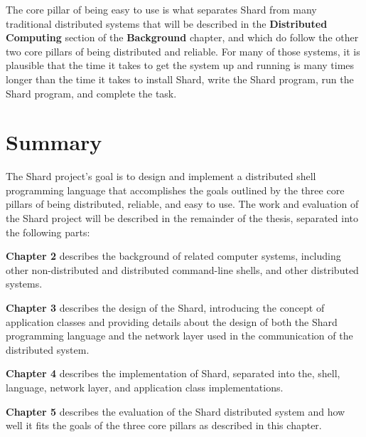 \documentclass[twoside]{report}
\begin{document}
The core pillar of being easy to use is what separates Shard from many traditional distributed systems that will be described in the \textbf{Distributed Computing} section of the \textbf{Background} chapter, and which do follow the other two core pillars of being distributed and reliable. For many of those systems, it is plausible that the time it takes to get the system up and running is many times longer than the time it takes to install Shard, write the Shard program, run the Shard program, and complete the task.

\section{Summary}

The Shard project's goal is to design and implement a distributed shell programming language that accomplishes the goals outlined by the three core pillars of being distributed, reliable, and easy to use.
The work and evaluation of the Shard project will be described in the remainder of the thesis, separated into the following parts:

\textbf{Chapter 2} describes the background of related computer systems, including other non-distributed and distributed command-line shells, and other distributed systems.

\textbf{Chapter 3} describes the design of the Shard, introducing the concept of application classes and providing details about the design of both the Shard programming language and the network layer used in the communication of the distributed system.

\textbf{Chapter 4} describes the implementation of Shard, separated into the, shell, language, network layer, and application class implementations.

\textbf{Chapter 5} describes the evaluation of the Shard distributed system and how well it fits the goals of the three core pillars as described in this chapter.
\end{document}
